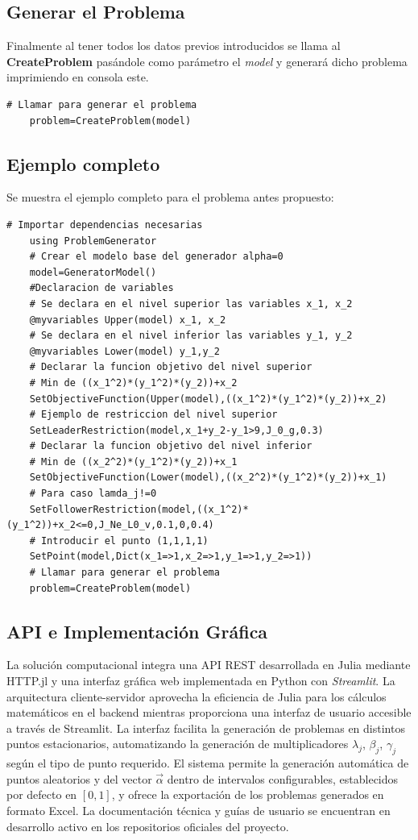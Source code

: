 \subsection{Generar el Problema}
Finalmente al tener todos los datos previos introducidos se llama al \textbf{CreateProblem} pasándole como parámetro el \textit{model} 
y generará dicho problema imprimiendo en consola este.

\begin{lstlisting}[caption={Generar el problema}]
    # Llamar para generar el problema
    problem=CreateProblem(model)
\end{lstlisting}

    
\subsection{Ejemplo completo}
Se muestra el ejemplo completo para el problema antes propuesto:
\begin{lstlisting}[caption={Script}]
    # Importar dependencias necesarias
    using ProblemGenerator
    # Crear el modelo base del generador alpha=0
    model=GeneratorModel()
    #Declaracion de variables
    # Se declara en el nivel superior las variables x_1, x_2
    @myvariables Upper(model) x_1, x_2
    # Se declara en el nivel inferior las variables y_1, y_2
    @myvariables Lower(model) y_1,y_2
    # Declarar la funcion objetivo del nivel superior
    # Min de ((x_1^2)*(y_1^2)*(y_2))+x_2
    SetObjectiveFunction(Upper(model),((x_1^2)*(y_1^2)*(y_2))+x_2)
    # Ejemplo de restriccion del nivel superior
    SetLeaderRestriction(model,x_1+y_2-y_1>9,J_0_g,0.3)
    # Declarar la funcion objetivo del nivel inferior
    # Min de ((x_2^2)*(y_1^2)*(y_2))+x_1
    SetObjectiveFunction(Lower(model),((x_2^2)*(y_1^2)*(y_2))+x_1)
    # Para caso lamda_j!=0
    SetFollowerRestriction(model,((x_1^2)*(y_1^2))+x_2<=0,J_Ne_L0_v,0.1,0,0.4)
    # Introducir el punto (1,1,1,1)
    SetPoint(model,Dict(x_1=>1,x_2=>1,y_1=>1,y_2=>1))
    # Llamar para generar el problema
    problem=CreateProblem(model)
\end{lstlisting}



\subsection*{API e Implementación Gráfica}
La solución computacional integra una API REST 
desarrollada en Julia mediante HTTP.jl y una interfaz gráfica web implementada en Python con \textit{Streamlit}. 
La arquitectura cliente-servidor aprovecha la eficiencia de Julia para los cálculos matemáticos en el backend mientras proporciona una 
interfaz de usuario accesible a través de Streamlit. 
La interfaz facilita la generación de problemas en distintos puntos estacionarios, 
automatizando la generación de multiplicadores $\lambda_j$, $\beta_j$, $\gamma_j$ según el tipo de punto requerido. 
El sistema permite la generación automática de puntos aleatorios y del vector $\vec{\alpha}$ dentro de intervalos configurables, 
establecidos por defecto en $[0,1]$, y ofrece la exportación de los problemas generados en formato Excel. 
La documentación técnica y guías de usuario se encuentran en desarrollo activo en los repositorios oficiales del proyecto.

